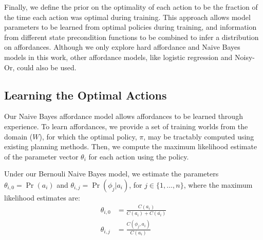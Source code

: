 \documentclass[letterpaper]{article}
\begin{document}
Finally, we define the prior on the optimality of each action to be
the fraction of the time each action was optimal during training.
This approach allows model parameters to be learned from optimal
policies during training, and information from different state
precondition functions to be combined to infer a distribution on
affordances.  Although we only explore hard affordance and Naive Bayes
models in this work, other affordance models, like logistic regression
and Noisy-Or, could also be used.






\subsection{Learning the Optimal Actions}
Our Naive Bayes affordance model allows
affordances to be learned through experience.  To learn affordances,
we provide a set of training worlds from the domain ($W$), for which
the optimal policy, $\pi$, may be tractably computed using existing
planning methods. Then, we compute the maximum likelihood estimate of the
parameter vector $\theta_i$ for each action using the policy.

Under our Bernouli Naive Bayes model, we estimate the parameters
$\theta_{i,0} = \Pr(a_i)$ and $\theta_{i,j} = \Pr(\phi_j | a_i)$, for $j \in \{1, \ldots, n \}$, where the maximum likelihood estimates are:
\begin{align}
\theta_{i,0} &= \frac{C(a_i)}{C(a_i) + C(\bar{a_i})} \\
\theta_{i,j} &= \frac{C(\phi_j, a_i)}{C(a_i)}
\end{align}
\end{document}
